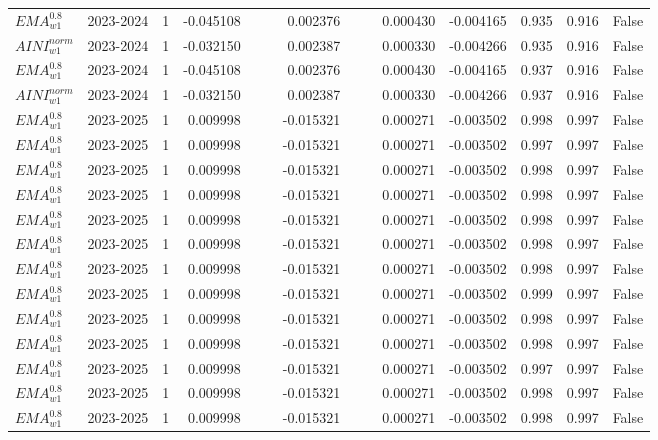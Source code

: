 \begin{tabular}{@{}llrrrrrrrrrlll@{}}
$EMA^{0.8}_{w1}$ & 2023-2024 & 1 & -0.045108 &  &  & 0.002376 &  &  & 0.000430 & -0.004165 & 0.935 & 0.916 & False \\
$AINI^{norm}_{w1}$ & 2023-2024 & 1 & -0.032150 &  &  & 0.002387 &  &  & 0.000330 & -0.004266 & 0.935 & 0.916 & False \\
$EMA^{0.8}_{w1}$ & 2023-2024 & 1 & -0.045108 &  &  & 0.002376 &  &  & 0.000430 & -0.004165 & 0.937 & 0.916 & False \\
$AINI^{norm}_{w1}$ & 2023-2024 & 1 & -0.032150 &  &  & 0.002387 &  &  & 0.000330 & -0.004266 & 0.937 & 0.916 & False \\
$EMA^{0.8}_{w1}$ & 2023-2025 & 1 & 0.009998 &  &  & -0.015321 &  &  & 0.000271 & -0.003502 & 0.998 & 0.997 & False \\
$EMA^{0.8}_{w1}$ & 2023-2025 & 1 & 0.009998 &  &  & -0.015321 &  &  & 0.000271 & -0.003502 & 0.997 & 0.997 & False \\
$EMA^{0.8}_{w1}$ & 2023-2025 & 1 & 0.009998 &  &  & -0.015321 &  &  & 0.000271 & -0.003502 & 0.998 & 0.997 & False \\
$EMA^{0.8}_{w1}$ & 2023-2025 & 1 & 0.009998 &  &  & -0.015321 &  &  & 0.000271 & -0.003502 & 0.998 & 0.997 & False \\
$EMA^{0.8}_{w1}$ & 2023-2025 & 1 & 0.009998 &  &  & -0.015321 &  &  & 0.000271 & -0.003502 & 0.998 & 0.997 & False \\
$EMA^{0.8}_{w1}$ & 2023-2025 & 1 & 0.009998 &  &  & -0.015321 &  &  & 0.000271 & -0.003502 & 0.998 & 0.997 & False \\
$EMA^{0.8}_{w1}$ & 2023-2025 & 1 & 0.009998 &  &  & -0.015321 &  &  & 0.000271 & -0.003502 & 0.998 & 0.997 & False \\
$EMA^{0.8}_{w1}$ & 2023-2025 & 1 & 0.009998 &  &  & -0.015321 &  &  & 0.000271 & -0.003502 & 0.999 & 0.997 & False \\
$EMA^{0.8}_{w1}$ & 2023-2025 & 1 & 0.009998 &  &  & -0.015321 &  &  & 0.000271 & -0.003502 & 0.998 & 0.997 & False \\
$EMA^{0.8}_{w1}$ & 2023-2025 & 1 & 0.009998 &  &  & -0.015321 &  &  & 0.000271 & -0.003502 & 0.998 & 0.997 & False \\
$EMA^{0.8}_{w1}$ & 2023-2025 & 1 & 0.009998 &  &  & -0.015321 &  &  & 0.000271 & -0.003502 & 0.997 & 0.997 & False \\
$EMA^{0.8}_{w1}$ & 2023-2025 & 1 & 0.009998 &  &  & -0.015321 &  &  & 0.000271 & -0.003502 & 0.998 & 0.997 & False \\
$EMA^{0.8}_{w1}$ & 2023-2025 & 1 & 0.009998 &  &  & -0.015321 &  &  & 0.000271 & -0.003502 & 0.998 & 0.997 & False \\

\end{tabular}
